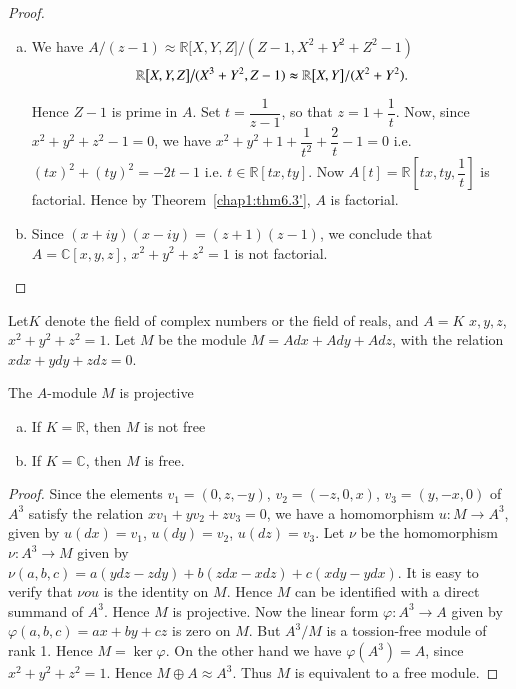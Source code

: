 \begin{proof}
\begin{enumerate}[(a)]
\item We have $A/ (z-1) \approx \mathbb{R} \big[X, Y, Z \big] \big/
  (Z-1, X^2 +  Y^2 + Z^2 -1)$ 
$$
\mathbb{R} \big[X, Y, Z \big]  \big/ (X^3+ Y^2, Z-1) \thickapprox
\mathbb{R} \big[X, Y \big] /(X^2+Y^2). 
$$

\noindent
Hence $Z-1$ is prime in $A$. Set $t =\dfrac{1}{z-1}$, so that
$z=1+\dfrac{1}{t}$. Now, since $x^2 + y^2 + z^2 - 1 = 0$, we have $x^2
+ y^2 + 1 + \dfrac{1}{t^2} + \dfrac{2}{t} - 1 = 0$ i.e. $(tx)^2 +
(ty)^2 = - 2t - 1$ i.e. $t \in \mathbb{R}[tx, ty]$. Now $A[t] =
\mathbb{R}[tx, ty, \dfrac{1}{t}]$ is factorial. Hence by 
Theorem~\ref{chap1:thm6.3'}, $A$ is factorial.
 
\item Since $(x + iy) (x - iy) = (z + 1) (z - 1)$, we conclude that $A
  = \mathbb{C} [x, y, z]$, $x^2 + y^2 + z^2 = 1$ is not factorial. 
\end{enumerate}
\end{proof}

Let\pageoriginale $K$ denote the field of complex numbers or the field
of reals, and 
$A= K$ $x, y, z$, $x^2 + y^2+ z^2=1$. Let $M$ be the module  $M = Adx
+ Ady + Adz$, with the relation $xdx + ydy + zdz = 0$. 


\begin{prop} %
The $A$-module $M$ is projective
\begin{enumerate}[(a)]
\item If $K = \mathbb{R}$, then $M$ is not free

\item If $K = \mathbb{C}$, then $M$ is free.
\end{enumerate}
\end{prop}  

  
\begin{proof}
Since the elements $v_1 = (0, z, -y)$, $v_2 = (-z, 0, x )$, $v_3 = (y, -x,
0)$ of $A^3$ satisfy the relation $xv_1 +  yv_2 + zv_3 =  0$, we have
a homomorphism $u : M \rightarrow A^3$, given by $u(dx) = v_1$, $u(dy) =
v_2$, $u(dz) = v_3$. Let $\nu$ be the homomorphism $\nu : A^3
\rightarrow M$ given by $\nu (a, b, c) = a(ydz - zdy)+ b(zdx - xdz) +
c (xdy - ydx)$. It is easy to verify that $\nu o u$ is the identity on
$M$. Hence $M$ can be identified with a direct summand of $A^3$. Hence
$M$ is projective. Now the linear form $\varphi : A^3 \rightarrow A$
given by $\varphi (a, b, c) = ax + by + cz$ is zero on $M$. But
$A^3/M$ is  a tossion-free module of rank 1. Hence $M = \ker
\varphi$. On the other hand we have $\varphi (A^3) = A$, since
$x^2+y^2+z^2=1$. Hence $M \oplus A \approx  A^3$. Thus $M$ is
equivalent to a free module. 
\end{proof}  

